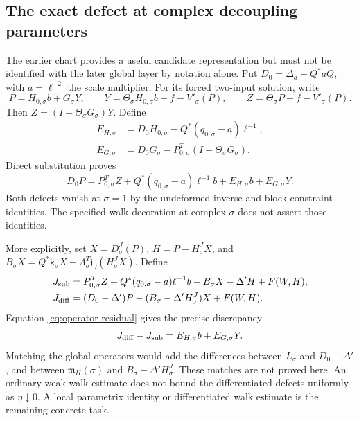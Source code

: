\documentclass[11pt]{article}
\theoremstyle{remark}
\begin{document}
\subsection{The exact defect at complex decoupling parameters}

The earlier chart provides a useful candidate representation but must
not be identified with the later global layer by notation alone. Put
$D_0=\Delta_a-Q^*aQ$, with $a=\ell^{-2}$ the scale multiplier. For its
forced two-input solution, write
\[
 P=H_{0,\sigma}b+G_\sigma Y,
 \qquad Y=\Theta_\sigma H_{0,\sigma}b-f-V'_\sigma(P),
 \qquad Z=\Theta_\sigma P-f-V'_\sigma(P).
\]
Then $Z=(I+\Theta_\sigma G_\sigma)Y$. Define
\begin{align*}
 E_{H,\sigma}&=D_0H_{0,\sigma}
   -Q^*(q_{0,\sigma}-a)\ell^{-1},\\
 E_{G,\sigma}&=D_0G_\sigma
   -P_{0,\sigma}^{T}(I+\Theta_\sigma G_\sigma).
\end{align*}
Direct substitution proves
\begin{equation}\label{eq:operator-residual}
 D_0P=P_{0,\sigma}^{T}Z+Q^*(q_{0,\sigma}-a)\ell^{-1}b
       +E_{H,\sigma}b+E_{G,\sigma}Y.
\end{equation}
Both defects vanish at $\sigma=1$ by the undeformed inverse and block
constraint identities. The specified walk decoration at complex
$\sigma$ does not assert those identities.

More explicitly, set $X=D^J_\sigma(P)$, $H=P-H^J_\sigma X$, and
$B_\sigma X=Q^*\mathsf k_\sigma X+
\Lambda_\sigma^T\mathfrak j_J(H^J_\sigma X)$. Define
\begin{align*}
 J_{\rm sub}&=P_{0,\sigma}^{T}Z+
 Q^*(q_{0,\sigma}-a)\ell^{-1}b-B_\sigma X-\Delta'H+F(W,H),\\
 J_{\rm diff}&=(D_0-\Delta')P-
 (B_\sigma-\Delta'H^J_\sigma)X+F(W,H).
\end{align*}
Equation \eqref{eq:operator-residual} gives the precise discrepancy
\begin{equation}\label{eq:current-residual}
 J_{\rm diff}-J_{\rm sub}=E_{H,\sigma}b+E_{G,\sigma}Y.
\end{equation}
Matching the global operators would add the differences between
$L_\sigma$ and $D_0-\Delta'$, and between $\mathfrak m_H(\sigma)$ and
$B_\sigma-\Delta'H^J_\sigma$. These matches are not proved here.
An ordinary weak walk estimate does not bound the differentiated
defects uniformly as $\eta\downarrow0$. A local parametrix identity or
differentiated walk estimate is the remaining concrete task.
\end{document}
